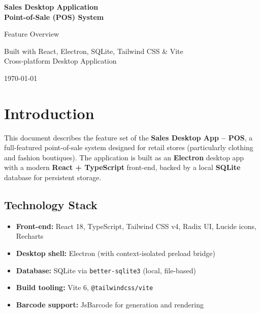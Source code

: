 \documentclass[12pt,a4paper]{article}
\begin{document}
\begin{titlepage}
  \centering
  \vspace*{3cm}
  {\Huge\bfseries Sales Desktop Application\\[0.3em] Point-of-Sale (POS) System\par}
  \vspace{1.5cm}
  {\Large Feature Overview\par}
  \vspace{2cm}
  {\large
    Built with React, Electron, SQLite, Tailwind CSS \& Vite\\[0.6em]
    Cross-platform Desktop Application
  \par}
  \vfill
  {\large \today\par}
\end{titlepage}

\tableofcontents
\newpage

\section{Introduction}

This document describes the feature set of the \textbf{Sales Desktop App -- POS},
a full-featured point-of-sale system designed for retail stores (particularly
clothing and fashion boutiques). The application is built as an
\textbf{Electron} desktop app with a modern \textbf{React + TypeScript}
front-end, backed by a local \textbf{SQLite} database for persistent storage.

\subsection{Technology Stack}

\begin{itemize}[leftmargin=1.5em]
  \item \textbf{Front-end:} React 18, TypeScript, Tailwind CSS v4, Radix UI, Lucide icons, Recharts
  \item \textbf{Desktop shell:} Electron (with context-isolated preload bridge)
  \item \textbf{Database:} SQLite via \texttt{better-sqlite3} (local, file-based)
  \item \textbf{Build tooling:} Vite 6, \texttt{@tailwindcss/vite}
  \item \textbf{Barcode support:} JsBarcode for generation and rendering
\end{itemize}
\end{document}
